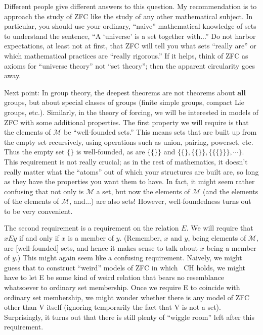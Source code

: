 \documentclass[10pt]{article}
\begin{document}
Different people give different answers to this question. My recommendation is to approach the study of ZFC like the study of any other mathematical subject. In particular, you should use your ordinary, ``naive'' mathematical knowledge of sets to understand the sentence, ``A `universe' is a set together with...'' Do not harbor expectations, at least not at first, that ZFC will tell you what sets ``really are'' or which mathematical practices are ``really rigorous.'' If it helps, think of ZFC as axioms for ``universe theory'' not ``set theory''; then the apparent circularity goes away.

Next point: In group theory, the deepest theorems are not theorems about \textbf{all} groups, but about special classes of groups (finite simple groups, compact Lie groups, etc.). Similarly, in the theory of forcing, we will be interested in models of ZFC with some additional properties. The first property we will require is that the elements of $\mathcal{M}$ be ``well-founded sets.'' This means sets that are built up from the empty set recursively, using operations such as union, pairing, powerset, etc. Thus the empty set $\{\}$ is well-founded, as are $\{\{\}\}$ and $\{\{\}, \{\{\}\}, \{\{\{\}\}\}, \cdots\}$. This requirement is not really crucial; as in the rest of mathematics, it doesn't really matter what the ``atoms'' out of which your structures are built are, so long as they have the properties you want them to have. In fact, it might seem rather confusing that not only is $\mathcal{M}$ a set, but now the elements of $\mathcal{M}$ (and the elements of the elements of $\mathcal M$, and...) are also sets! However, well-foundedness turns out to be very convenient.

The second requirement is a requirement on the relation $E$. We will require that $x E y$ if and only if $x$ is a member of $y$. (Remember, $x$ and $y$, being elements of $\mathcal M$, are [well-founded] sets, and hence it makes sense to talk about $x$ being a member of $y$.) This might again seem like a confusing requirement. Naively, we might guess that to construct ``weird'' models of ZFC in which ~CH holds, we might have to let E be some kind of weird relation that bears no resemblance whatsoever to ordinary set membership. Once we require E to coincide with ordinary set membership, we might wonder whether there is any model of ZFC other than V itself (ignoring temporarily the fact that V is not a set). Surprisingly, it turns out that there is still plenty of ``wiggle room'' left after this requirement.
\end{document}
